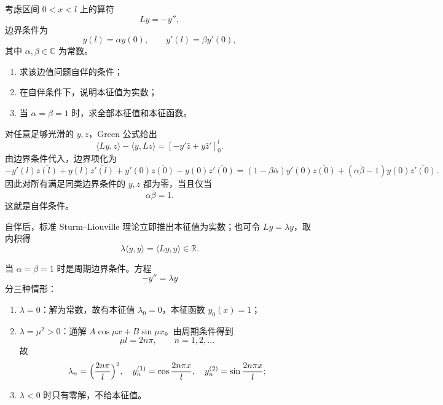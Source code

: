 \begin{question}
考虑区间 $0<x<l$ 上的算符
\[
Ly=-y'',
\]
边界条件为
\[
y(l)=\alpha y(0),\qquad y'(l)=\beta y'(0),
\]
其中 $\alpha,\beta\in\mathbb C$ 为常数。
\begin{enumerate}[label=(\arabic*),leftmargin=2.8em,itemsep=0.2em]
\item 求该边值问题自伴的条件；
\item 在自伴条件下，说明本征值为实数；
\item 当 $\alpha=\beta=1$ 时，求全部本征值和本征函数。
\end{enumerate}
\begin{solution}

对任意足够光滑的 $y,z$，Green 公式给出
\[
\langle Ly,z\rangle-\langle y,Lz\rangle=[-y'\bar z+y\bar z']_0^l.
\]
由边界条件代入，边界项化为
\[
-y'(l)\overline{z(l)}+y(l)\overline{z'(l)}+y'(0)\overline{z(0)}-y(0)\overline{z'(0)}
=(1-\beta\overline\alpha)y'(0)\overline{z(0)}+(\alpha\overline\beta-1)y(0)\overline{z'(0)}.
\]
因此对所有满足同类边界条件的 $y,z$ 都为零，当且仅当
\[
\alpha\overline\beta=1.
\]
这就是自伴条件。

自伴后，标准 Sturm--Liouville 理论立即推出本征值为实数；也可令 $Ly=\lambda y$，取内积得
\[
\lambda\langle y,y\rangle=\langle Ly,y\rangle\in\mathbb R.
\]

当 $\alpha=\beta=1$ 时是周期边界条件。方程
\[
-y''=\lambda y
\]
分三种情形：
\begin{enumerate}[label=(\arabic*),leftmargin=2.8em,itemsep=0.2em]
\item $\lambda=0$：解为常数，故有本征值 $\lambda_0=0$，本征函数 $y_0(x)=1$；
\item $\lambda=\mu^2>0$：通解 $A\cos\mu x+B\sin\mu x$。由周期条件得到
\[
\mu l=2n\pi,\qquad n=1,2,\dots
\]
故
\[
\lambda_n=\Bigl(\frac{2n\pi}{l}\Bigr)^2,
\quad y_n^{(1)}=\cos\frac{2n\pi x}{l},
\quad y_n^{(2)}=\sin\frac{2n\pi x}{l};
\]
\item $\lambda<0$ 时只有零解，不给本征值。
\end{enumerate}

\end{solution}
\end{question}


